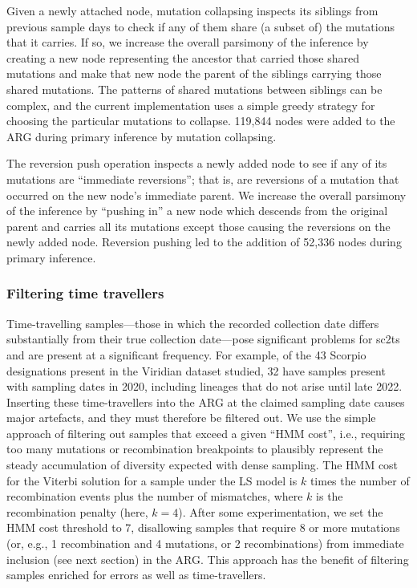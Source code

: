 \documentclass[12pt]{article}
\begin{document}
Given a newly attached node, mutation collapsing inspects its siblings from
previous sample days to check if any of them share (a subset of) the mutations
that
it carries. If so, we increase the overall parsimony of the inference
by creating a new node representing the ancestor that carried
those shared mutations and make that new node the parent of the
siblings carrying those shared mutations.
The patterns of
shared mutations between siblings can be complex, and the current
implementation uses a simple greedy strategy for choosing
the particular mutations to collapse.
119,844 nodes were
added to the ARG during primary inference by mutation collapsing.

The reversion push operation inspects a newly added node to see
if any of its mutations are ``immediate reversions''; that is,
are reversions of a mutation that occurred on the new node's
immediate parent. We increase the overall parsimony of the
inference by ``pushing in'' a new node which descends from the
original parent and carries all its mutations except those
causing the reversions on the newly added node.
Reversion pushing led to the addition of 52,336 nodes during primary inference.

\subsubsection*{Filtering time travellers}
Time-travelling samples---those in which the recorded collection date differs
substantially from their true collection date---pose significant problems
for sc2ts and are present at a significant frequency. For example, of the
43 Scorpio~\cite{Colquhoun2023scorpio}
designations present in the Viridian dataset studied, 32 have
samples present with sampling dates in 2020, including lineages that do not
arise until late 2022. Inserting these time-travellers into the ARG
at the claimed sampling date causes major artefacts, and they must therefore be
filtered out. We use the simple approach of filtering out samples that
exceed a given ``HMM cost'', i.e., requiring too many mutations or
recombination breakpoints to plausibly represent the steady accumulation
of diversity expected with dense sampling.
The HMM cost for the Viterbi solution for a sample under the LS model
is $k$ times the number of recombination events plus the number of
mismatches, where $k$ is the recombination penalty (here, $k=4$).
After some experimentation, we set the HMM cost threshold to 7,
disallowing samples that require 8 or more mutations (or, e.g., 1 recombination
and 4 mutations, or 2 recombinations) from immediate inclusion (see next
section) in the ARG. This approach has the benefit of filtering
samples enriched for errors as well as time-travellers.
\end{document}
